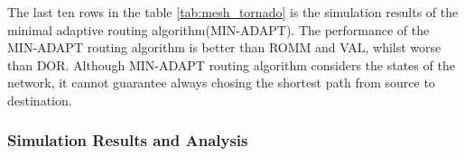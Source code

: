 The last ten rows in the table \ref{tab:mesh_tornado} is the simulation results of the minimal adaptive routing algorithm(MIN-ADAPT). The performance of the MIN-ADAPT routing algorithm is better than ROMM and VAL, whilst worse than DOR. Although MIN-ADAPT routing algorithm considers the states of the network, it cannot guarantee always chosing the shortest path from source to destination.



\subsubsection{Simulation Results and Analysis}
\label{sec:mesh_tornado_results}
